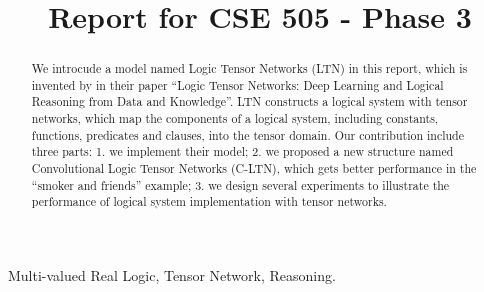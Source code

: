\documentclass[conference]{IEEEtran}
\begin{document}
%
\title{Report for CSE 505 - Phase 3}


\author{
}

\maketitle


\begin{abstract}
We introcude a model named Logic Tensor Networks (LTN) in this report, which is invented by \cite{serafini2016logic} in their paper ``Logic Tensor Networks: Deep Learning and Logical Reasoning from Data and Knowledge''.
LTN constructs a logical system with tensor networks, which map the components of a logical system, including constants, functions, predicates and clauses, into  the tensor domain.
Our contribution include three parts: 1. we implement their model; 2. we proposed a new structure named Convolutional Logic Tensor Networks (C-LTN), which gets better performance in the ``smoker and friends'' example; 3. we design several experiments to illustrate the performance of logical system implementation with tensor networks.
\end{abstract}

\begin{IEEEkeywords}
Multi-valued Real Logic, Tensor Network, Reasoning.
\end{IEEEkeywords}
















\end{document}
